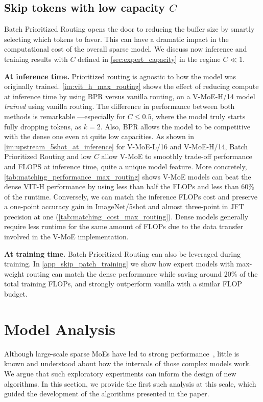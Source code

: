 \documentclass{article}
\newcommand{\abbv}{{V-MoE}}
\newcommand{\maxrouting}{Batch Prioritized Routing}
\begin{document}
\subsection{Skip tokens with low capacity \texorpdfstring{$C$}{C}}
\maxrouting{} opens the door to reducing the buffer size by smartly selecting which tokens to favor. This can have a dramatic impact in the computational cost of the overall sparse model.
We discuss now inference and training results with $C$ defined in \cref{sec:expert_capacity} in the regime  $C \ll 1$. 

\textbf{At inference time.}
Prioritized routing is agnostic to how the model was originally trained.
\cref{im:vit_h_max_routing} shows the effect of reducing compute at inference time by using BPR versus vanilla routing, on a \abbv{}-H/14 model \emph{trained} using vanilla routing.
The difference in performance between both methods is remarkable ---especially for $C \le 0.5$, where the model truly starts fully dropping tokens, as $k=2$.
Also, BPR allows the model to be competitive with the dense one even at quite low capacities.
As shown in \cref{im:upstream_5shot_at_inference} for \abbv{}-L/16 and \abbv{}-H/14, \maxrouting{} and low $C$ allow \abbv{} to smoothly trade-off performance and FLOPS at inference time, quite a unique model feature.
More concretely, \cref{tab:matching_performance_max_routing} shows \abbv{} models can beat the dense VIT-H performance by using less than half the FLOPs and less than 60\% of the runtime.
Conversely, we can match the inference FLOPs cost and preserve a one-point accuracy gain in ImageNet/5shot and almost three-point in JFT precision at one (\cref{tab:matching_cost_max_routing}).
Dense models generally require less runtime for the same amount of FLOPs due to the data transfer involved in the \abbv{} implementation.

\textbf{At training time.}
\maxrouting{} can also be leveraged during training.
In \cref{app_skip_patch_training} we show how expert models with max-weight  routing can match the dense performance while saving around 20\% of the total training FLOPs, and strongly outperform vanilla with a similar FLOP budget. \section{Model Analysis}
\label{sec:model_analysis}


Although large-scale sparse MoEs have led to strong performance~\cite{fedus2021switch, lepikhin2020gshard, shazeer2017outrageously},
little is known and understood about how the internals of those complex models work.
We argue that such exploratory experiments can inform the design of new algorithms. In this section, we provide the first such analysis at this scale, which guided the development of the algorithms presented in the paper.
\end{document}

